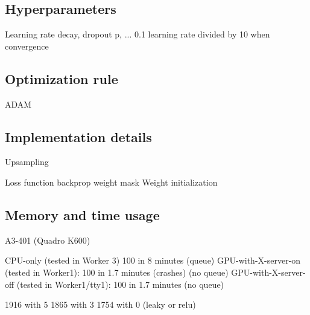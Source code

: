 \subsection{Hyperparameters}
Learning rate decay, dropout p, ...
0.1 learning rate divided by 10 when convergence

\subsection{Optimization rule}
ADAM


\subsection{Implementation details}
Upsampling

Loss function backprop weight mask
Weight initialization

\subsection{Memory and time usage}
A3-401 (Quadro K600)

CPU-only (tested in Worker 3) 100 in 8 minutes (queue)
GPU-with-X-server-on (tested in Worker1): 100 in 1.7 minutes (crashes) (no queue)
GPU-with-X-server-off (tested in Worker1/tty1): 100 in 1.7 minutes (no queue)

1916 with 5
1865 with 3 
1754 with 0 (leaky or relu)
